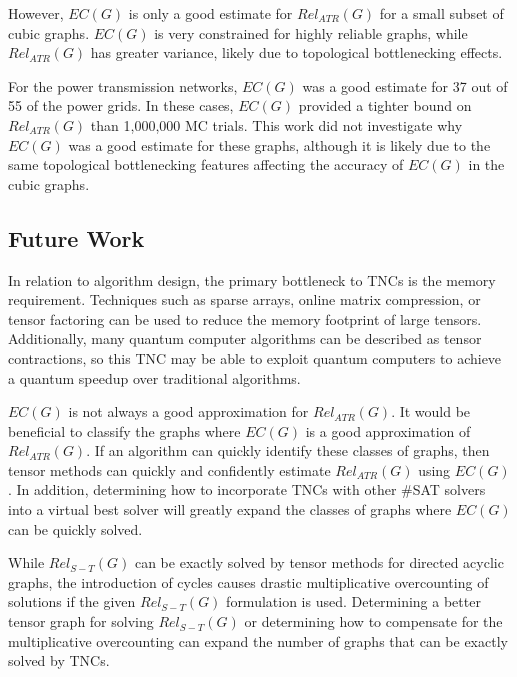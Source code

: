 \documentclass[12pt,twocolumn]{article}
\begin{document}
However, \(EC(G)\) is only a good estimate for \(Rel_{ATR}(G)\) for a small subset of cubic graphs. \(EC(G)\) is very constrained for highly reliable graphs, while \(Rel_{ATR}(G)\) has greater variance, likely due to topological bottlenecking effects.

For the power transmission networks, \(EC(G)\) was a good estimate for 37 out of 55 of the power grids. In these cases, \(EC(G)\) provided a tighter bound on \(Rel_{ATR}(G)\) than 1,000,000 MC trials. This work did not investigate why \(EC(G)\) was a good estimate for these graphs, although it is likely due to the same topological bottlenecking features affecting the accuracy of \(EC(G)\) in the cubic graphs.

\hypertarget{future-work}{%
\subsection{Future Work}\label{future-work}}

In relation to algorithm design, the primary bottleneck to TNCs is the memory requirement. Techniques such as sparse arrays, online matrix compression, or tensor factoring can be used to reduce the memory footprint of large tensors. Additionally, many quantum computer algorithms can be described as tensor contractions, so this TNC may be able to exploit quantum computers to achieve a quantum speedup over traditional algorithms.

\(EC(G)\) is not always a good approximation for \(Rel_{ATR}(G)\). It would be beneficial to classify the graphs where \(EC(G)\) is a good approximation of \(Rel_{ATR}(G)\). If an algorithm can quickly identify these classes of graphs, then tensor methods can quickly and confidently estimate \(Rel_{ATR}(G)\) using \(EC(G)\). In addition, determining how to incorporate TNCs with other \#SAT solvers into a virtual best solver will greatly expand the classes of graphs where \(EC(G)\) can be quickly solved.

While \(Rel_{S-T}(G)\) can be exactly solved by tensor methods for directed acyclic graphs, the introduction of cycles causes drastic multiplicative overcounting of solutions if the given \(Rel_{S-T}(G)\) formulation is used. Determining a better tensor graph for solving \(Rel_{S-T}(G)\) or determining how to compensate for the multiplicative overcounting can expand the number of graphs that can be exactly solved by TNCs.


\end{document}
